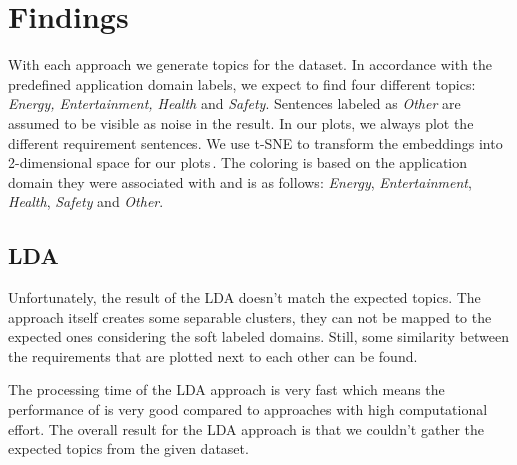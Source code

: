 \section{Findings} %
\label{sec:findings}
With each approach we generate topics for the \crowdre{} dataset. In accordance with the predefined application domain labels, we expect to find four different topics: \textit{Energy, Entertainment, Health} and \textit{Safety}. Sentences labeled as \textit{Other} are assumed to be visible as noise in the result.
In our plots, we always plot the different requirement sentences. We use t-SNE to transform the embeddings into 2-dimensional space for our plots\,\cite{maaten_visualizing_2008}. The coloring is based on the application domain they were associated with and is as follows: \textcolor{clr_energy}{\emph{Energy}}, \textcolor{clr_entertainment}{\emph{Entertainment}}, \textcolor{clr_health}{\emph{Health}}, \textcolor{clr_safety}{\emph{Safety}} and \textcolor{clr_other}{\emph{Other}}.

\subsection{LDA} %
\label{sub:findings_lda}

Unfortunately, the result of the LDA doesn't match the expected topics. The approach itself creates some separable clusters, they can not be mapped to the expected ones considering the soft labeled domains. Still, some similarity between the requirements that are plotted next to each other can be found.

The processing time of the LDA approach is very fast which means the performance of is very good compared to approaches with high computational effort. The overall result for the LDA approach is that we couldn't gather the expected topics from the given dataset. 

